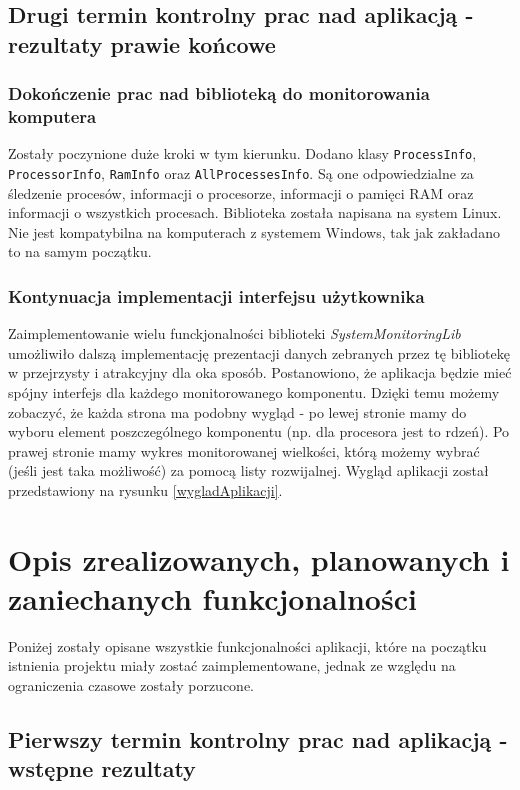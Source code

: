 \documentclass[a4paper]{article}
\begin{document}
\subsection{Drugi termin kontrolny prac nad aplikacją - rezultaty prawie końcowe}

\subsubsection{Dokończenie prac nad biblioteką do monitorowania komputera}

Zostały poczynione duże kroki w tym kierunku. Dodano klasy \texttt{ProcessInfo}, \texttt{ProcessorInfo}, \texttt{RamInfo} oraz \texttt{AllProcessesInfo}. Są one odpowiedzialne za śledzenie procesów, informacji o procesorze, informacji o pamięci
RAM oraz informacji o wszystkich procesach. Biblioteka została napisana na system Linux. Nie jest kompatybilna na komputerach z systemem Windows, tak jak zakładano to na samym początku. 

\subsubsection{Kontynuacja implementacji interfejsu użytkownika}

Zaimplementowanie wielu funckjonalności biblioteki \textit{SystemMonitoringLib} umożliwiło dalszą implementację
prezentacji danych zebranych przez tę bibliotekę w przejrzysty i atrakcyjny dla oka sposób. Postanowiono, że aplikacja
będzie mieć spójny interfejs dla każdego monitorowanego komponentu. Dzięki temu możemy zobaczyć, że każda strona ma podobny wygląd - po lewej stronie mamy do wyboru element poszczególnego komponentu (np. dla procesora jest to rdzeń). Po prawej stronie mamy wykres monitorowanej wielkości, którą możemy wybrać (jeśli jest taka możliwość) za pomocą listy rozwijalnej. Wygląd aplikacji został przedstawiony na rysunku \ref{wygladAplikacji}.

\section{Opis zrealizowanych, planowanych i zaniechanych funkcjonalności}

Poniżej zostały opisane wszystkie funkcjonalności aplikacji, które na początku istnienia projektu
miały zostać zaimplementowane, jednak ze względu na ograniczenia czasowe zostały porzucone.

\subsection{Pierwszy termin kontrolny prac nad aplikacją - wstępne rezultaty}
\end{document}
